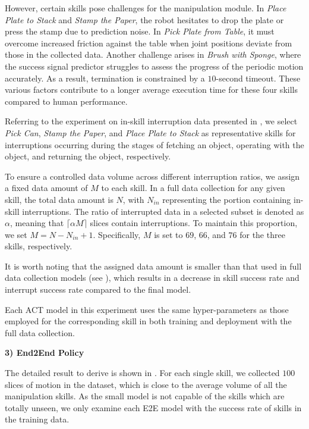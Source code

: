 However, certain skills pose challenges for the manipulation module. In \textit{Place Plate to Stack} and \textit{Stamp the Paper}, the robot hesitates to drop the plate or press the stamp due to prediction noise. 
In \textit{Pick Plate from Table}, it must overcome increased friction against the table when joint positions deviate from those in the collected data.
Another challenge arises in \textit{Brush with Sponge}, where the success signal predictor struggles to assess the progress of the periodic motion accurately. 
As a result, termination is constrained by a $10$-second timeout. 
These various factors contribute to a longer average execution time for these four skills compared to human performance.

Referring to the experiment on in-skill interruption data presented in , we select \textit{Pick Can}, \textit{Stamp the Paper}, and \textit{Place Plate to Stack} as representative skills for interruptions occurring during the stages of fetching an object, operating with the object, and returning the object, respectively.

To ensure a controlled data volume across different interruption ratios, we assign a fixed data amount of $M$ to each skill. 
In a full data collection for any given skill, the total data amount is $N$, with $N_{in}$ representing the portion containing in-skill interruptions. 
The ratio of interrupted data in a selected subset is denoted as $\alpha$, meaning that $\lceil\alpha M\rceil$ slices contain interruptions. 
To maintain this proportion, we set $M=N-N_{in}+1$. 
Specifically, $M$ is set to $69$, $66$, and $76$ for the three skills, respectively.

It is worth noting that the assigned data amount is smaller than that used in full data collection models (see ), which results in a decrease in skill success rate and interrupt success rate compared to the final model.

Each ACT model in this experiment uses the same hyper-parameters as those employed for the corresponding skill in both training and deployment with the full data collection.


\noindent\textbf{3) End2End Policy}



The detailed result to derive  is shown in .
For each single skill, we collected $100$ slices of motion in the dataset, which is close to the average volume of all the manipulation skills.
As the small model is not capable of the skills which are totally unseen, we only examine each E2E model with the success rate of skills in the training data.


